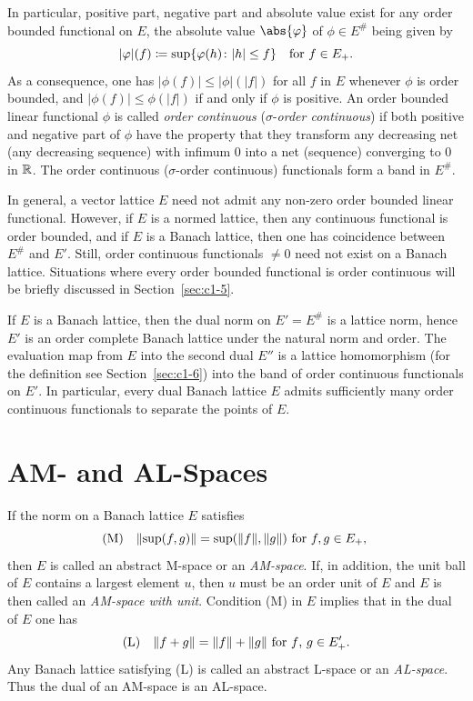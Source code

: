 In particular, positive part, negative part and absolute value exist for any order bounded functional on $ E $, the absolute value $\abs{\phi}$ of\/ $ \phi \in E^{\#} $ being given by
\[
	|\phi|(f) \coloneq \sup\{\phi(h) \colon |h| \leq f\} \quad \text{for $ f \in E_{+} $}.
\]
As a consequence, one has $ |\phi(f)| \leq |\phi|(|f|) $ for all $ f $ in $ E $ whenever $ \phi $ is order bounded, and $ |\phi(f)| \leq \phi(|f|) $ if and only if\/ $ \phi $ is positive.
An order bounded linear functional $ \phi $ is called \emph{order continuous} ($ \sigma $-\emph{order continuous}) if both positive and negative part of\/ $ \phi $ have the property that they transform any decreasing net (any decreasing sequence) with infimum $ 0 $ into a net (sequence) converging to $ 0 $ in $ \mathbb{R} $.
The order continuous ($ \sigma $-order continuous) functionals form a band in $ E^{\#} $.

In general, a vector lattice $ E $ need not admit any non-zero order bounded linear functional.
However, if\/ $ E $ is a normed lattice, then any continuous functional is order bounded, and if\/ $ E $ is a Banach lattice, then one has coincidence between $ E^{\#} $ and $ E' $.
Still, order continuous functionals $ \neq 0 $ need not exist on a Banach lattice.
Situations where every order bounded functional is order continuous will be briefly discussed in Section~\ref{sec:c1-5}.

If\/ $ E $ is a Banach lattice, then the dual norm on $ E' = E^{\#} $ is a lattice norm, hence $ E' $ is an order complete Banach lattice under the natural norm and order.
The evaluation map from $ E $ into the second dual $ E'' $ is a lattice homomorphism (for the definition see Section~\ref{sec:c1-6}) into the band of order continuous functionals on $ E' $.
In particular, every dual Banach lattice $ E $ admits sufficiently many order continuous functionals to separate the points of\/ $ E $.
\section{AM- and AL-Spaces}\label{sec:c1-4}%
%
If the norm on a Banach lattice $ E $ satisfies
\begin{equation*}
	\mathrm{(M)} \quad \lVert \sup(f,g) \rVert = \sup(\lVert f \rVert,\|g\|) \text{ for $ f, g \in E_{+}$, }  
\end{equation*}
then $ E $ is called an abstract M-space or an \emph{AM-space}.
If, in addition, the unit ball of\/ $ E $ contains a largest element $ u $, then $ u $ must be an order unit of\/ $ E $ and $ E $ is then called an \emph{AM-space with unit}.
Condition (M) in $ E $ implies that in the dual of\/ $ E $ one has
\begin{equation*}
	\mathrm{(L)} \quad \|f + g\| = \|f\| + \|g\| \text{ for $ f $, $ g \in E'_{+}$.} 
\end{equation*}
Any Banach lattice satisfying (L) is called an abstract L-space or an \emph{AL-space}.
Thus the dual of an AM-space is an AL-space.

